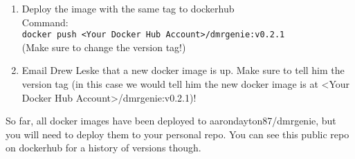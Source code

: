\documentclass{article}
\begin{document}
\begin{multicols}{2}
\begin{enumerate}
  
 
  \item Deploy the image with the same tag to dockerhub\\
  Command:\\
 \lstinline|docker push <Your Docker Hub Account>/dmrgenie:v0.2.1| \\(Make sure to change the version tag!) 
 
  \item Email Drew Leske that a new docker image is up. Make sure to tell him the version tag (in this case we would tell him the new docker image is at <Your Docker Hub Account>/dmrgenie:v0.2.1)!
\end{enumerate}

So far, all docker images have been deployed to aarondayton87/dmrgenie, but you will need to deploy them to your personal repo. You can see this public repo on dockerhub for a history of versions though.


\end{multicols}
\end{document}
